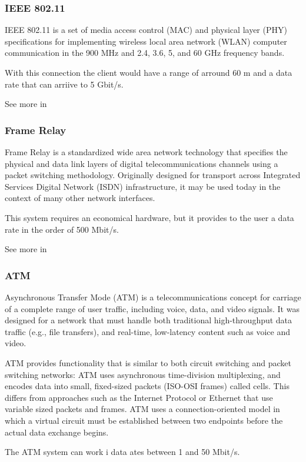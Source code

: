 \subsubsection{IEEE 802.11}
IEEE 802.11 is a set of media access control (MAC) and physical layer (PHY) specifications for implementing wireless local area network (WLAN) computer communication in the 900 MHz and 2.4, 3.6, 5, and 60 GHz frequency bands. 

With this connection the client would have a range of arround 60 m and  a data rate that can arriive to 5 Gbit/s.

See more in \cite{80211}

\subsubsection{Frame Relay}
Frame Relay is a standardized wide area network technology that specifies the physical and data link layers of digital telecommunications channels using a packet switching methodology. Originally designed for transport across Integrated Services Digital Network (ISDN) infrastructure, it may be used today in the context of many other network interfaces.

This system requires an economical hardware, but it provides to the user a data rate in the order of 500 Mbit/s.

See more in \cite{FrameRelay}

\subsubsection{ATM}
Asynchronous Transfer Mode (ATM) is a telecommunications concept for carriage of a complete range of user traffic, including voice, data, and video signals. It was designed for a network that must handle both traditional high-throughput data traffic (e.g., file transfers), and real-time, low-latency content such as voice and video. 

ATM provides functionality that is similar to both circuit switching and packet switching networks: ATM uses asynchronous time-division multiplexing, and encodes data into small, fixed-sized packets (ISO-OSI frames) called cells. This differs from approaches such as the Internet Protocol or Ethernet that use variable sized packets and frames. ATM uses a connection-oriented model in which a virtual circuit must be established between two endpoints before the actual data exchange begins.

The ATM system can work i data ates between 1 and 50 Mbit/s.

